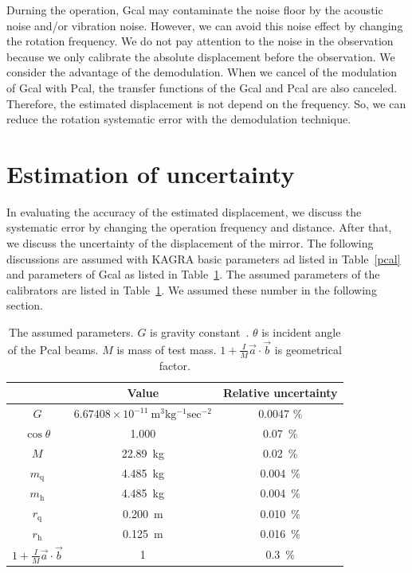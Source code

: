 \documentclass[%
 reprint,
superscriptaddress,
 amsmath,amssymb,
 aps,
]{revtex4-1}
\begin{document}
Durning the operation, Gcal may contaminate the noise floor by the acoustic noise and/or vibration noise. However, we can avoid this noise effect by changing the rotation frequency. We do not pay attention to the noise in the observation because we only calibrate the absolute displacement before the observation.
We consider the advantage of the demodulation. When we cancel of the modulation of Gcal with Pcal, the transfer functions of the Gcal and Pcal are also canceled. Therefore, the estimated displacement is not depend on the frequency. So, we can reduce the rotation systematic error with the demodulation technique.

\section{Estimation of uncertainty} \label{sec:EST}
In evaluating the accuracy of the estimated displacement, we discuss the systematic error by changing the operation frequency and distance. After that, we discuss the uncertainty of the displacement of the mirror. 
The following discussions are assumed with KAGRA basic parameters ad listed in Table~\ref{pcal} and parameters of Gcal as listed in Table~\ref{sus}. The assumed parameters of the calibrators are listed in Table~\ref{sus}. We assumed these number in the following section.

\begin{table}
\begin{center}
\caption{\label{sus}The assumed parameters. $G$ is gravity constant~\cite{RevModPhys.88.035009}. $\theta$ is incident angle of the Pcal beams. $M$ is mass of test mass. $1+\frac{I}{M}\vec{a}\cdot \vec{b}$ is geometrical factor.}
\footnotesize
\begin{tabular}{ccc}
\hline
&Value&Relative uncertainty \\
\hline
$G$&$6.67408 \times 10^{-11}~\mathrm{m^3kg^{-1}sec^{-2}}$&0.0047 \%\\
$\cos{\theta}$ &1.000& 0.07~\%\\
$M$ &22.89~kg & 0.02~\%\\
$m_{\mathrm{q}}$&4.485~kg & 0.004~\%\\
$m_{\mathrm{h}}$& 4.485~kg &0.004~\%\\
$r_{\mathrm{q}}$&0.200~m & 0.010~\%\\
$r_{\mathrm{h}}$& 0.125~m & 0.016~\%\\
$1+\frac{I}{M}\vec{a}\cdot \vec{b}$& 1&0.3~\% \\
\hline
\end{tabular}\\
\end{center}
\end{table}
\end{document}
